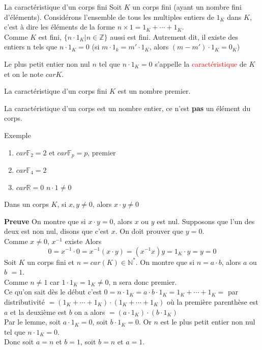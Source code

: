 \begin{parag}{La caractéristique d'un corps fini}
    Soit $K$ un corps fini (ayant un nombre fini d'éléments). Considérons l'ensemble de tous les multiples entiers de $1_K$ dans $K$, c'est à dire les éléments de la forme $n \times 1 = 1_K + \cdots + 1_K$.\\
    Comme $K$ est fini, $\{n\cdot 1_K| n \in \mathbb{Z}\}$ aussi est fini. Autrement dit, il existe des entiers n tels que $n \cdot 1_K = 0$ (si $m \cdot 1_k = m'\cdot 1_K$, alors $(m-m')\cdot 1_K = 0_K$)
    \begin{definition}
        Le plus petit entier non nul $n$ tel que $n\cdot 1_K = 0$ s'appelle la \textcolor{red}{caractéristique} de $K$ et on le note $carK$.
    \end{definition}
    \begin{theoreme}
        La caractéristique d'un corps fini $K$ est un nombre premier.
    \end{theoreme}
    \begin{framedremark}
        La caractéristique d'un corps est un nombre entier, ce n'est \textbf{pas} un élément du corps.
    \end{framedremark}
    \begin{subparag}{Exemple}
        \begin{enumerate}
            \item $car\mathbb{F}_2 = 2$ et $car\mathbb{F}_p = p$, premier
            \item $car\mathbb{F}_4 = 2$
            \item $car\mathbb{R} = 0$ $n\cdot1 \neq 0$
        \end{enumerate}
        \begin{lemme}
            Dans un corps $K$, si $x, y \neq 0$, alors $x\cdot y \neq 0$
        \end{lemme}
        \textbf{Preuve} On montre que si $x\cdot y = 0$, alors $x$ ou $y$ est nul. Supposons que l'un des deux est non nul, disons que c'est $x$. On doit prouver que $y = 0$.\\
        Comme $x \neq 0$, $x^{-1}$ existe Alors
        \[0 = x^{-1}\cdot 0 = x^{-1}(x\cdot y) = (x^{-1}x)y = 1_K\cdot y = y = 0\]
        Soit $K$ un corps fini et $n = car(K) \in \mathbb{N}^*$. On montre que si $n = a\cdot b$, alors $a$ ou $b$ $= 1$.
        \\
        Comme $n \neq 1$ car $1\cdot 1_K = 1_K \neq 0$, n sera donc premier.
        \\
        Ce qu'on sait dès le début c'est $0 = n\cdot 1_K = a\cdot b \cdot 1_K = 1_K + \cdots + 1_K = $ par distributivité $ = (1_K + \cdots + 1_K)\cdot (1_K + \cdots + 1_K)$ où la première parenthèse est $a$ et la deuxième est $b$ on a alors $= (a\cdot 1_K)\cdot (b\cdot 1_K)$
        \\
        Par le lemme, soit $a\cdot 1_K = 0$, soit $b\cdot 1_K = 0$. Or $n$ est le plus petit entier non nul tel que $n \cdot 1_K = 0$.
        \\
        Donc soit $a = n$ et $b = 1$, soit $b = n$ et $a = 1$.
    \end{subparag}
\end{parag}

